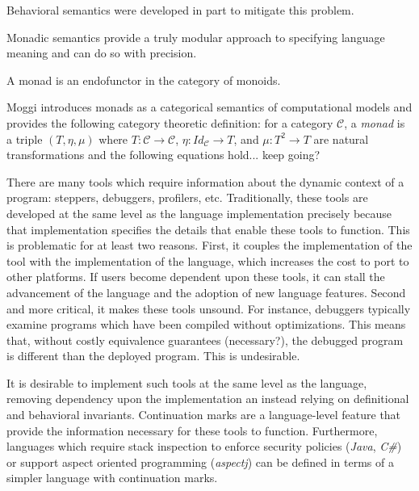 \documentclass[ms]{byuprop}
\begin{document}
Behavioral semantics were developed in part to mitigate this problem.

Monadic semantics provide a truly modular approach to specifying language meaning and can do so with precision.


A monad is an endofunctor in the category of monoids.

Moggi \cite{moggi1989computational} introduces monads as a categorical semantics of computational models and provides the following category theoretic definition: for a category $\mathcal{C}$, a \emph{monad} is a triple $(T,\eta,\mu)$ where $T:\mathcal{C}\rightarrow\mathcal{C}$, $\eta:Id_{\mathcal{C}}\rightarrow T$, and $\mu:T^{2}\rightarrow T$ are natural transformations and the following equations hold... keep going?


There are many tools which require information about the dynamic context of a program: steppers, debuggers, profilers, etc. Traditionally, these tools are developed at the same level as the language implementation precisely because that implementation specifies the details that enable these tools to function. This is problematic for at least two reasons. First, it couples the implementation of the tool with the implementation of the language, which increases the cost to port to other platforms. If users become dependent upon these tools, it can stall the advancement of the language and the adoption of new language features. Second and more critical, it makes these tools unsound. For instance, debuggers typically examine programs which have been compiled without optimizations. %
This means that, without costly equivalence guarantees (necessary?), the debugged program  is different than the deployed program. This is undesirable.

It is desirable to implement such tools at the same level as the language, removing dependency upon the implementation an instead relying on definitional and behavioral invariants. Continuation marks are a language-level feature that provide the information necessary for these tools to function. Furthermore, languages which require stack inspection to enforce security policies (\emph{Java}, \emph{C\#}) or support aspect oriented programming (\emph{aspectj}) can be defined in terms of a simpler language with continuation marks.
\end{document}
